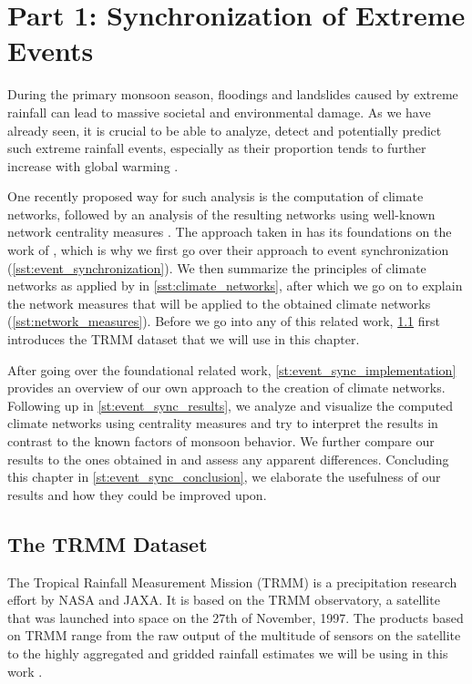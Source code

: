 \chapter{Part 1: Synchronization of Extreme Events}
\label{c:event_sync}
During the primary monsoon season, floodings and landslides caused by extreme rainfall can lead to massive societal and environmental damage. As we have already seen, it is crucial to be able to analyze, detect and potentially predict such extreme rainfall events, especially as their proportion tends to further increase with global warming \citep{Stolbova.2015}.

One recently proposed way for such analysis is the computation of climate networks, followed by an analysis of the resulting networks using well-known network centrality measures \citep{Stolbova.2015}. The approach taken in \citet{Stolbova.2015} has its foundations on the work of \citet{QuianQuiroga.2002}, which is why we first go over their approach to event synchronization (\cref{sst:event_synchronization}). We then summarize the principles of climate networks as applied by \citet{Stolbova.2015} in \cref{sst:climate_networks}, after which we go on to explain the network measures that will be applied to the obtained climate networks (\cref{sst:network_measures}). Before we go into any of this related work, \cref{st:trmm_dataset} first introduces the TRMM dataset that we will use in this chapter.

After going over the foundational related work, \cref{st:event_sync_implementation} provides an overview of our own approach to the creation of climate networks. Following up in \cref{st:event_sync_results}, we analyze and visualize the computed climate networks using centrality measures and try to interpret the results in contrast to the known factors of monsoon behavior. We further compare our results to the ones obtained in \citet{Stolbova.2015} and assess any apparent differences. Concluding this chapter in \cref{st:event_sync_conclusion}, we elaborate the usefulness of our results and how they could be improved upon.


\section{The TRMM Dataset}
\label{st:trmm_dataset}
The Tropical Rainfall Measurement Mission (TRMM) is a precipitation research effort by NASA and JAXA. It is based on the TRMM observatory, a satellite that was launched into space on the 27th of November, 1997. The products based on TRMM range from the raw output of the multitude of sensors on the satellite to the highly aggregated and gridded rainfall estimates we will be using in this work \citep{GoddardEarthScienceDataInformationandServicesCenter.2016}.


